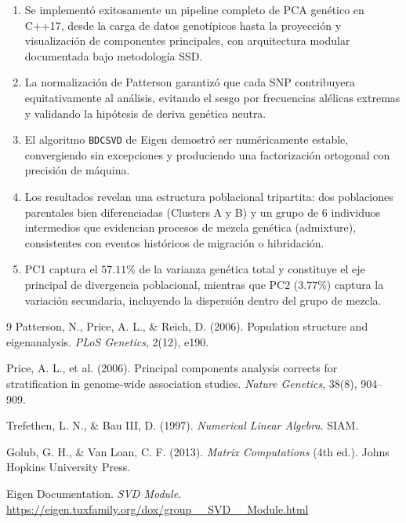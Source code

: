 \documentclass[12pt,a4paper]{article}
\theoremstyle{definition}
\begin{document}
\begin{enumerate}
    \item Se implement\'{o} exitosamente un pipeline completo de PCA gen\'{e}tico en C++17, desde la carga de datos genot\'{i}picos hasta la proyecci\'{o}n y visualizaci\'{o}n de componentes principales, con arquitectura modular documentada bajo metodolog\'{i}a SSD.

    \item La normalizaci\'{o}n de Patterson garantiz\'{o} que cada SNP contribuyera equitativamente al an\'{a}lisis, evitando el sesgo por frecuencias al\'{e}licas extremas y validando la hip\'{o}tesis de deriva gen\'{e}tica neutra.

    \item El algoritmo \texttt{BDCSVD} de Eigen demostr\'{o} ser num\'{e}ricamente estable, convergiendo sin excepciones y produciendo una factorizaci\'{o}n ortogonal con precisi\'{o}n de m\'{a}quina.

    \item Los resultados revelan una estructura poblacional tripartita: dos poblaciones parentales bien diferenciadas (Clusters A y B) y un grupo de 6 individuos intermedios que evidencian procesos de mezcla gen\'{e}tica (admixture), consistentes con eventos hist\'{o}ricos de migraci\'{o}n o hibridaci\'{o}n.

    \item PC1 captura el $57.11\%$ de la varianza gen\'{e}tica total y constituye el eje principal de divergencia poblacional, mientras que PC2 ($3.77\%$) captura la variaci\'{o}n secundaria, incluyendo la dispersi\'{o}n dentro del grupo de mezcla.
\end{enumerate}

\begin{thebibliography}{9}
 Patterson, N., Price, A. L., \& Reich, D. (2006). Population structure and eigenanalysis. \textit{PLoS Genetics}, 2(12), e190.

 Price, A. L., et al. (2006). Principal components analysis corrects for stratification in genome-wide association studies. \textit{Nature Genetics}, 38(8), 904--909.

 Trefethen, L. N., \& Bau III, D. (1997). \textit{Numerical Linear Algebra}. SIAM.

 Golub, G. H., \& Van Loan, C. F. (2013). \textit{Matrix Computations} (4th ed.). Johns Hopkins University Press.

 Eigen Documentation. \textit{SVD Module.} \url{https://eigen.tuxfamily.org/dox/group__SVD__Module.html}
\end{thebibliography}
\end{document}
